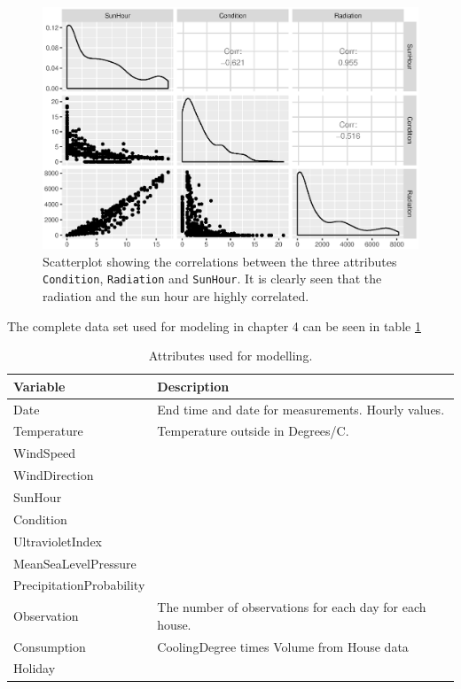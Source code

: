 \begin{figure}
    \centering
    \includegraphics[width=.8\textwidth]{../../../figures/gg_cor.eps}
    \caption{Scatterplot showing the correlations between the three attributes \texttt{Condition}, \texttt{Radiation} and \texttt{SunHour}. It is clearly seen that the radiation and the sun hour are highly correlated.}
    \label{fig: gg_cor}
\end{figure}



\noindent The complete data set used for modeling in chapter 4 can be seen in table \ref{tab: modeldata} 
\begin{table}
    \centering
    \begin{tabular}{ll}
     \hline
     \textbf{Variable} & \textbf{Description} \\
    \hline
    \hline
    Date  &  End time and date for measurements. Hourly values.\\
    Temperature  &  Temperature outside in Degrees/C. \\
    WindSpeed  &  \\
    WindDirection  &  \\
    SunHour  &  \\
    Condition  & \\
    UltravioletIndex  &   \\
    MeanSeaLevelPressure  & \\
    PrecipitationProbability & \\
    Observation & The number of observations for each day for each house.\\
    Consumption & CoolingDegree times Volume from House data \\
    Holiday & \\
    \hline
    \end{tabular}
    \caption{Attributes used for modelling.}
    \label{tab: modeldata}
\end{table}   